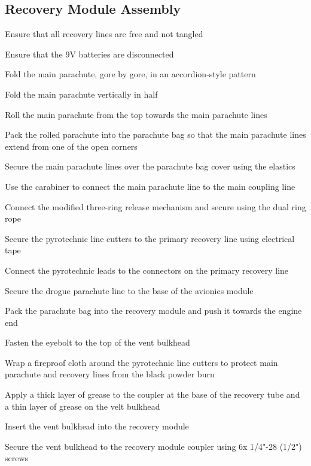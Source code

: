     \subsection{Recovery Module Assembly}
        \begin{checklist}
            \item Ensure that all recovery lines are free and not tangled
            \item Ensure that the 9V batteries are disconnected
            \item Fold the main parachute, gore by gore, in an accordion-style pattern
            \item Fold the main parachute vertically in half
            \item Roll the main parachute from the top towards the main parachute lines
            \item Pack the rolled parachute into the parachute bag so that the main parachute lines extend from one of the open corners
            \item Secure the main parachute lines over the parachute bag cover using the elastics
            \item Use the carabiner to connect the main parachute line to the main coupling line
            \item Connect the modified three-ring release mechanism and secure using the dual ring rope
            \item Secure the pyrotechnic line cutters to the primary recovery line using electrical tape
            \item Connect the pyrotechnic leads to the connectors on the primary recovery line
            \item Secure the drogue parachute line to the base of the avionics module
            \item Pack the parachute bag into the recovery module and push it towards the engine end
            \item Fasten the eyebolt to the top of the vent bulkhead
            \item Wrap a fireproof cloth around the pyrotechnic line cutters to protect main parachute and recovery lines from the black powder burn
            \item Apply a thick layer of grease to the coupler at the base of the recovery tube and a thin layer of grease on the velt bulkhead
            \item Insert the vent bulkhead into the recovery module
            \item Secure the vent bulkhead to the recovery module coupler using 6x 1/4"-28 (1/2") screws

\end{checklist}
